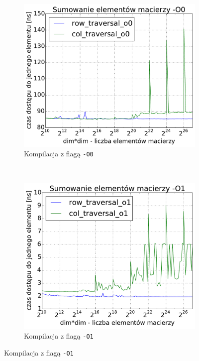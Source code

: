 \begin{figure}[!h]
	\centering
	\begin{subfigure}[c]{0.45\textwidth}
		\centering
		\includegraphics[width=\textwidth]{images/benchs/matrix_sum_O0}
		\caption{Kompilacja z flagą \texttt{-O0}}
	\end{subfigure}
	~
	\begin{subfigure}[c]{0.45\textwidth}
		\centering
		\includegraphics[width=\textwidth]{images/benchs/matrix_sum_O1}
		\caption{Kompilacja z flagą \texttt{-O1}}

\end{subfigure}
\end{figure}
